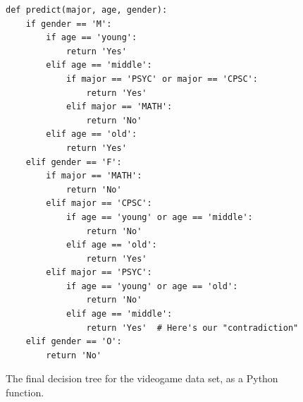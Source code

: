 \begin{figure}[ht]
\centering
\begin{Verbatim}[fontsize=\footnotesize,samepage=true,frame=single,framesep=3mm,xleftmargin=.2cm,xrightmargin=.2cm]
def predict(major, age, gender):
    if gender == 'M':
        if age == 'young':
            return 'Yes'
        elif age == 'middle':
            if major == 'PSYC' or major == 'CPSC':
                return 'Yes'
            elif major == 'MATH':
                return 'No'
        elif age == 'old':
            return 'Yes'
    elif gender == 'F':
        if major == 'MATH':
            return 'No'
        elif major == 'CPSC':
            if age == 'young' or age == 'middle':
                return 'No'
            elif age == 'old':
                return 'Yes'
        elif major == 'PSYC':
            if age == 'young' or age == 'old':
                return 'No'
            elif age == 'middle':
                return 'Yes'  # Here's our "contradiction"
    elif gender == 'O':
        return 'No'
\end{Verbatim}
\caption{The final decision tree for the videogame data set, as a Python
function.}
\label{fig:completeVgTreePython}
\end{figure}

